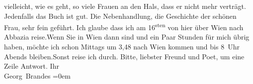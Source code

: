 \begin{ledgroupsized}[t]{13cm}
               vielleicht, wie es geht, so viele Frauen an den Hals, dass er nicht mehr verträgt.
               Jedenfalls {\pb}das Buch ist gut. Die Nebenhandlung, die
               Geschichte der schönen Frau, sehr fein geführt.\pend
           \pstart
           Ich glaube dass ich am 16\textsuperscript{sten} von hier über Wien nach Abbazia reise.\hspace*{1.5em}Wenn Sie in Wien dann sind und ein Paar Stunden
               für mich übrig haben, möchte ich schon Mittags um 3,48 nach Wien kommen und bis 8 Uhr Abends
                  bleiben.\hspace*{1.5em}Sonst reise ich durch.\pend
           \pstart
           Bitte, liebster Freund und Poet, um eine Zeile Antwort.\pend
           \pstart
           Ihr{\\[\baselineskip]}\spacefill\mbox{Georg Brandes}\pend
           \leftskip=0em{}
         
         \endnumbering{}\end{ledgroupsized}  \newcommand{\dateiname}{L01116}\newcommand{\titel}{Georg Brandes an Arthur Schnitzler, 10. 5. [1901]}\newcommand{\editorInnen}{Martin Anton Müller und Gerd-Hermann Susen}
      